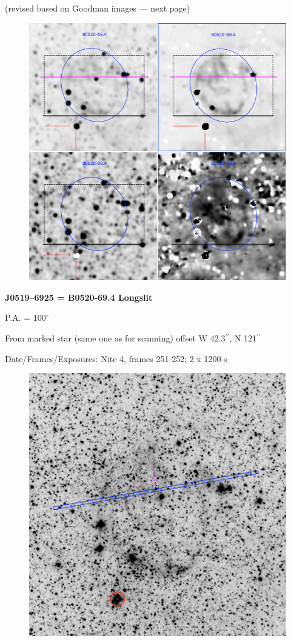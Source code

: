 \documentclass[11pt]{article}
\newcommand{\arcsec}{$^{\prime\prime}$}
\begin{document}
(revised based on Goodman images --- next page)

\begin{figure}
\includegraphics[width=12.5cm]{snapshots/B0520_694_5arcmin.png}
\end{figure}

\newpage
{\bf J0519--6925 = B0520-69.4 Longslit}
 
 P.A. = 100$^\circ$
 
From marked star (same one as for scanning)
offset W 42.3\arcsec, N 121\arcsec

Date/Frames/Exposures:   Nite 4, frames 251-252;  2 x 1200 s


\begin{figure}
\includegraphics[width=12.5cm]{snapshots/B0520_longslit.png}
\end{figure}
\end{document}
